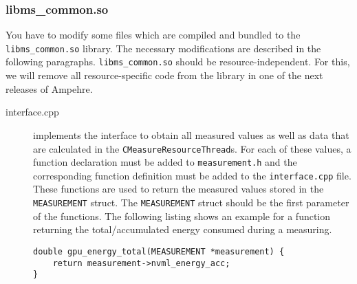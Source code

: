\subsubsection{libms\_common.so}
You have to modify some files which are compiled and bundled to the \texttt{libms\_common.so} library. The necessary modifications are described in the following paragraphs. \texttt{libms\_common.so} should be resource-independent. For this, we will remove all resource-specific code from the library in one of the next releases of Ampehre.

\begin{description}
\item[interface.cpp] implements the interface to obtain all measured values as well as data that are calculated in the \texttt{CMeasureResourceThread}s. For each of these values, a function declaration must be added to \texttt{measurement.h} and the corresponding function definition must be added to the \texttt{interface.cpp} file. These functions are used to return the measured values stored in the \texttt{MEASUREMENT} struct. The \texttt{MEASUREMENT} struct should be the first parameter of the functions. The following listing shows an example for a function returning the total/accumulated energy consumed during a measuring.
\begin{lstlisting}[caption={Example for a function to return values stored in a \texttt{MEASUREMENT} struct.}, label=lst:GPUEnergyExample]
double gpu_energy_total(MEASUREMENT *measurement) {
	return measurement->nvml_energy_acc;
}
\end{lstlisting}


\end{description}
